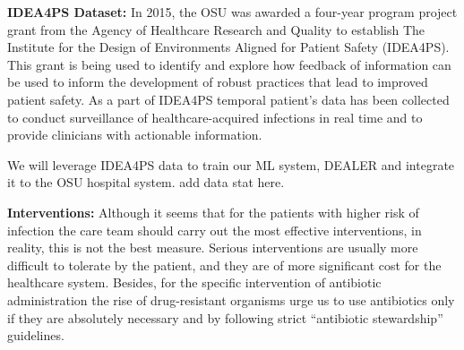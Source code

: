 %



{\bf IDEA4PS Dataset:}
In 2015, the OSU was awarded a four-year program project grant from the Agency of Healthcare Research and Quality to establish The Institute for the Design of Environments Aligned for Patient Safety (IDEA4PS). This grant is being used to identify and explore how feedback of information can be used to inform the development of robust practices that lead to improved patient safety. As a part of IDEA4PS temporal patient's data has been collected to conduct surveillance of healthcare-acquired infections in real time and to provide clinicians with actionable information.

We will leverage IDEA4PS data to train our ML system, DEALER and integrate it to the OSU hospital system. {\color{red} add data stat here. }


{\bf Interventions:}
Although it seems that for the patients with higher risk of infection the care team should carry out the most effective interventions, in reality, this is not the best measure. Serious interventions are usually more difficult to tolerate by the patient, and they are of more significant cost for the healthcare system. Besides, for the specific intervention of antibiotic administration the rise of drug-resistant organisms urge us to use antibiotics only if they are absolutely necessary and by following strict ``antibiotic stewardship'' guidelines.

